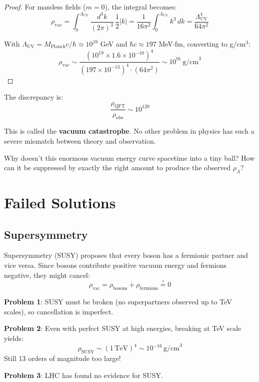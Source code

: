 \begin{proof}
For massless fields ($m = 0$), the integral becomes:
\begin{equation}
\rho_{\text{vac}} = \int_0^{\Lambda_{\text{UV}}} \frac{d^3k}{(2\pi)^3} \, \frac{1}{2} |k| = \frac{1}{16\pi^2} \int_0^{\Lambda_{\text{UV}}} k^3 \, dk = \frac{\Lambda_{\text{UV}}^4}{64\pi^2}
\end{equation}

With $\Lambda_{\text{UV}} = M_{\text{Planck}} c / \hbar \approx 10^{19}$ GeV and $\hbar c \approx 197$ MeV$\cdot$fm, converting to g/cm$^3$:
\begin{equation}
\rho_{\text{vac}} \sim \frac{(10^{19} \times 1.6 \times 10^{-10})^4}{(197 \times 10^{-13})^4 \cdot (64\pi^2)} \sim 10^{91} \, \text{g/cm}^3
\end{equation}
\end{proof}

\begin{keyidea}
The discrepancy is:
\begin{equation}
\boxed{\frac{\rho_{\text{QFT}}}{\rho_{\text{obs}}} \sim 10^{120}}
\end{equation}

This is called the \textbf{vacuum catastrophe}. No other problem in physics has such a severe mismatch between theory and observation.

Why doesn't this enormous vacuum energy curve spacetime into a tiny ball? How can it be suppressed by exactly the right amount to produce the observed $\rho_\Lambda$?
\end{keyidea}

\section{Failed Solutions}

\subsection{Supersymmetry}

\begin{level2}
Supersymmetry (SUSY)\cite{wess1974,nilles1984} proposes that every boson has a fermionic partner and vice versa. Since bosons contribute positive vacuum energy and fermions negative, they might cancel:
\begin{equation}
\rho_{\text{vac}} = \rho_{\text{bosons}} + \rho_{\text{fermions}} \stackrel{?}{=} 0
\end{equation}

\textbf{Problem 1}: SUSY must be broken (no superpartners observed up to TeV scales), so cancellation is imperfect.

\textbf{Problem 2}: Even with perfect SUSY at high energies, breaking at TeV scale yields:
\begin{equation}
\rho_{\text{SUSY}} \sim (1 \, \text{TeV})^4 \sim 10^{-16} \, \text{g/cm}^3
\end{equation}
Still 13 orders of magnitude too large!

\textbf{Problem 3}: LHC has found no evidence for SUSY\cite{atlas2023,cms2023}.
\end{level2}

